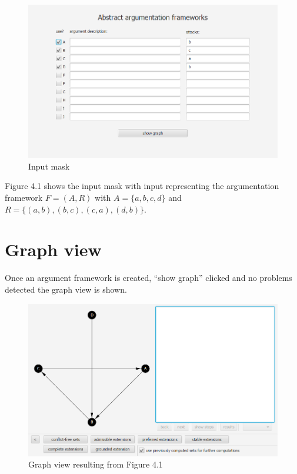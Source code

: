 \documentclass[draft,final]{vutinfth} %
\begin{document}
\FloatBarrier
	\begin{figure}[!htb]
		\centering
		\includegraphics[width=\linewidth]{pics/input.png}
		\caption{Input mask}
	\end{figure}
\FloatBarrier

Figure 4.1 shows the input mask with input representing the argumentation framework $F=(A,R)$ with $A=\{a,b,c,d\}$ and $R=\{(a,b),(b,c),(c,a),(d,b)\}$.

\section{Graph view}
Once an argument framework is created, ``show graph'' clicked and no problems detected the graph view is shown.

\FloatBarrier
	\begin{figure}[!htb]
		\centering
		\includegraphics[width=\linewidth]{pics/demo.png}
		\caption{Graph view resulting from Figure 4.1}
	\end{figure}
\FloatBarrier
\end{document}
